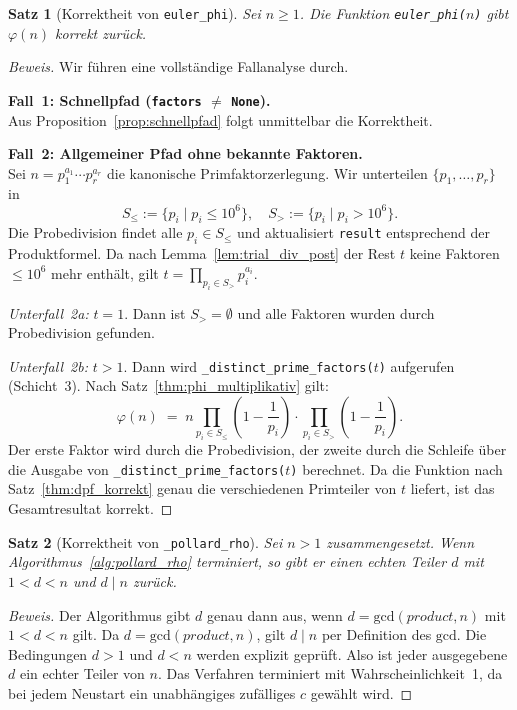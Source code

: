 ﻿\documentclass[12pt, a4paper]{article}
\theoremstyle{plain}
\newtheorem{theorem}{Satz}[section]
\theoremstyle{definition}
\theoremstyle{remark}
\newenvironment{myproof}[1][Beweis]{%
  \begin{proof}[#1]
}{%
  \end{proof}
}
\newcommand{\GCD}{\mathrm{gcd}}
\begin{document}
\begin{theorem}[Korrektheit von \texttt{euler\_phi}]\label{thm:euler_phi_korrekt}
  Sei $n \ge 1$. Die Funktion \texttt{euler\_phi($n$)} gibt $\varphi(n)$
  korrekt zur\"uck.
\end{theorem}

\begin{myproof}
  Wir f\"uhren eine vollst\"andige Fallanalyse durch.

  \textbf{Fall~1: Schnellpfad (\texttt{factors} $\ne$ \texttt{None}).}\\
  Aus Proposition~\ref{prop:schnellpfad} folgt unmittelbar die Korrektheit.

  \textbf{Fall~2: Allgemeiner Pfad ohne bekannte Faktoren.}\\
  Sei $n = p_1^{a_1} \cdots p_r^{a_r}$ die kanonische Primfaktorzerlegung.
  Wir unterteilen $\{p_1, \ldots, p_r\}$ in
  \[
    S_{\le} := \{p_i \mid p_i \le 10^6\}, \quad
    S_{>} := \{p_i \mid p_i > 10^6\}.
  \]
  Die Probedivision findet alle $p_i \in S_{\le}$ und aktualisiert
  \texttt{result} entsprechend der Produktformel. Da nach
  Lemma~\ref{lem:trial_div_post} der Rest $t$ keine Faktoren $\le 10^6$
  mehr enth\"alt, gilt $t = \prod_{p_i \in S_{>}} p_i^{a_i}$.

  \textit{Unterfall~2a:} $t = 1$. Dann ist $S_{>} = \emptyset$ und
  alle Faktoren wurden durch Probedivision gefunden.

  \textit{Unterfall~2b:} $t > 1$. Dann wird \texttt{\_distinct\_prime\_factors($t$)}
  aufgerufen (Schicht~3). Nach Satz~\ref{thm:phi_multiplikativ} gilt:
  \[
    \varphi(n) \;=\; n \prod_{p_i \in S_{\le}} \!\!\left(1-\frac{1}{p_i}\right)
                     \cdot \prod_{p_i \in S_{>}} \!\!\left(1-\frac{1}{p_i}\right).
  \]
  Der erste Faktor wird durch die Probedivision, der zweite durch die
  Schleife \"uber die Ausgabe von \texttt{\_distinct\_prime\_factors($t$)}
  berechnet. Da die Funktion nach Satz~\ref{thm:dpf_korrekt} genau die
  verschiedenen Primteiler von $t$ liefert, ist das Gesamtresultat korrekt.
\end{myproof}

\begin{theorem}[Korrektheit von \texttt{\_pollard\_rho}]\label{thm:pollard_rho_korrekt}
  Sei $n > 1$ zusammengesetzt. Wenn Algorithmus~\ref{alg:pollard_rho}
  terminiert, so gibt er einen echten Teiler $d$ mit $1 < d < n$ und
  $d \mid n$ zur\"uck.
\end{theorem}

\begin{myproof}
  Der Algorithmus gibt $d$ genau dann aus, wenn
  $d = \GCD(\mathit{product}, n)$ mit $1 < d < n$ gilt.
  Da $d = \GCD(\mathit{product}, n)$, gilt $d \mid n$ per Definition
  des $\GCD$. Die Bedingungen $d > 1$ und $d < n$ werden explizit
  gepr\"uft. Also ist jeder ausgegebene $d$ ein echter Teiler von $n$.
  Das Verfahren terminiert mit Wahrscheinlichkeit~1, da bei jedem
  Neustart ein unabh\"angiges zuf\"alliges $c$ gew\"ahlt wird.
\end{myproof}
\end{document}
